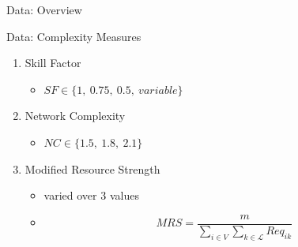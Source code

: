 \documentclass{beamer}
\begin{document}
\begin{frame}{Data: Overview}
\end{frame}

\begin{frame}{Data: Complexity Measures}
	\begin{enumerate}
		\item Skill Factor
		\vspace{1mm}
		\begin{itemize}
			\item $SF \in \{1,~0.75,~0.5,~variable\}$\pause
		\end{itemize}
		\vspace{2mm}
		\item Network Complexity
		\vspace{1mm}
		\begin{itemize}
			\item $NC \in \{1.5,~1.8,~2.1\}$\pause
		\end{itemize}
		\vspace{2mm}
		\item Modified Resource Strength
		\vspace{1mm}
		\begin{itemize}
			\item varied over 3 values
			\item \[MRS=\frac{m}{\sum_{i\in V}\sum_{k \in \mathscr{L}}Req_{ik}}\]
		\end{itemize}
	\end{enumerate}
\end{frame}


\end{document}
